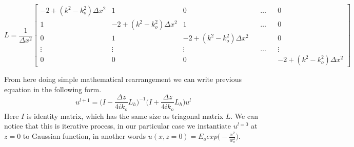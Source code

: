 \documentclass[a4paper]{article}
\begin{document}
	\setlength\arraycolsep{-4.5pt}
	\[ L = \frac{1}{\Delta x^2}\begin{bmatrix}
    -2+(k^2-k_o^2)\Delta x^2& 1& 0& &\dots& & 0 \\
    1 & -2+(k^2-k_o^2)\Delta x^2 & 1& &\dots& & 0 \\
    0 &     1& -2+(k^2-k_o^2)\Delta x^2 & & & & 0 \\
    \vdots & \vdots & \vdots & &\dots& & \vdots \\
    0& 0& 0& && &     -2+(k^2-k_o^2)\Delta x^2
	\end{bmatrix}\]
	
	
	From here doing simple mathematical rearrangement we can write previous equation in the following form.
		\[u^{l+1} = \bigg(I-\frac{\Delta z}{4ik_o}L_h\bigg)^{-1}\bigg(I+\frac{\Delta z}{4ik_o}L_h\bigg) u^l\]
	Here $I$ is identity matrix, which has the same size as triagonal matrix $L$. We can notice that this is iterative process, in our particular case we instantiate $u^{l=0}$ at $z = 0$ to Gaussian function, in another words $u(x,z=0)= E_oexp\big(-\frac{x^2}{w_o^2}\big)$.
	
\end{document}
